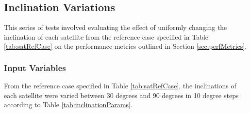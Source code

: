 \newpage
\subsection{Inclination Variations}
This series of tests involved evaluating the effect of uniformly changing the inclination of each satellite from the reference case specified in Table \ref{tab:satRefCase} on the performance metrics outlined in Section \ref{sec:perfMetrics}.
\subsubsection{Input Variables}
From the reference case specified in Table \ref{tab:satRefCase}, the inclinations of each satellite were varied between 30 degrees and 90 degrees in 10 degree steps according to Table \ref{tab:inclinationParams}.

